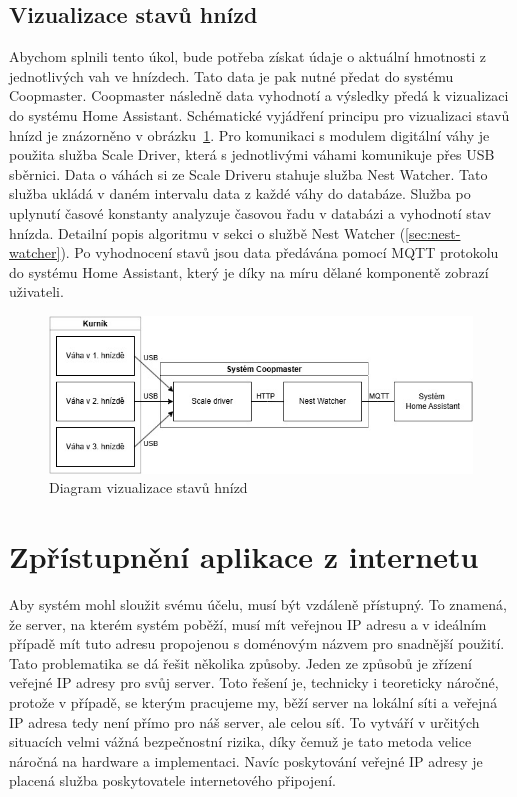 \subsection{Vizualizace stavů hnízd}
Abychom splnili tento úkol, bude potřeba získat údaje o aktuální hmotnosti z jednotlivých vah ve hnízdech.
Tato data je pak nutné předat do systému Coopmaster.
Coopmaster následně data vyhodnotí a výsledky předá k vizualizaci do systému Home Assistant.
Schématické vyjádření principu pro vizualizaci stavů hnízd je znázorněno v obrázku~\ref{fig:vizualizace_stavu_hnizd}. \newline
Pro komunikaci s modulem digitální váhy je použita služba Scale Driver, která s jednotlivými váhami komunikuje přes USB sběrnici.
Data o váhách si ze Scale Driveru stahuje služba Nest Watcher.
Tato služba ukládá v daném intervalu data z každé váhy do databáze.
Služba po uplynutí časové konstanty analyzuje časovou řadu v databázi a vyhodnotí stav hnízda.
Detailní popis algoritmu v sekci o službě Nest Watcher (\ref{sec:nest-watcher}).
Po vyhodnocení stavů jsou data předávána pomocí MQTT protokolu do systému Home Assistant, který je díky na míru dělané komponentě zobrazí uživateli.
\begin{figure}[h]
    \centering
    \includegraphics[width=\textwidth]{img/vizualizace_stavu_hnizd}
    \caption{Diagram vizualizace stavů hnízd}
    \label{fig:vizualizace_stavu_hnizd}
\end{figure}

\section{Zpřístupnění aplikace z internetu}\label{sec:zpristupneni-aplikace-z-internetu}
Aby systém mohl sloužit svému účelu, musí být vzdáleně přístupný.
To znamená, že server, na kterém systém poběží, musí mít veřejnou IP adresu a v ideálním případě mít tuto adresu propojenou s doménovým názvem pro snadnější použití.
Tato problematika se dá řešit několika způsoby.\newline
Jeden ze způsobů je zřízení veřejné IP adresy pro svůj server.
Toto řešení je, technicky i teoreticky náročné, protože v případě, se kterým pracujeme my, běží server na lokální síti a veřejná IP adresa tedy není přímo pro náš server, ale celou síť.
To vytváří v určitých situacích velmi vážná bezpečnostní rizika, díky čemuž je tato metoda velice náročná na hardware a implementaci.
Navíc poskytování veřejné IP adresy je placená služba poskytovatele internetového připojení.\newline

